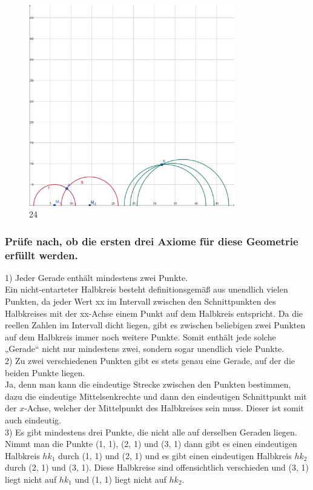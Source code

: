 \documentclass[12pt,a4paper]{article}
\begin{document}
\newpage
\begin{figure}[htbp]     
    \centering             
    \includegraphics[width=0.8\textwidth]{Hyperbolisch.png}     
    \caption{24}     
    \label{fig:24} 
\end{figure}
\subsubsection*{Prüfe nach, ob die ersten drei Axiome für diese Geometrie erfüllt werden.}
1) Jeder Gerade enthält mindestens zwei Punkte.\\
Ein nicht-entarteter Halbkreis besteht definitionsgemäß aus unendlich vielen Punkten, da jeder Wert xx im Intervall zwischen den Schnittpunkten des Halbkreises mit der xx-Achse einem Punkt auf dem Halbkreis entspricht. Da die reellen Zahlen im Intervall dicht liegen, gibt es zwischen beliebigen zwei Punkten auf dem Halbkreis immer noch weitere Punkte. Somit enthält jede solche „Gerade“ nicht nur mindestens zwei, sondern sogar unendlich viele Punkte.\\
2) Zu zwei verschiedenen Punkten gibt es stets genau eine Gerade, auf der die beiden Punkte liegen.\\
Ja, denn man kann die eindeutige Strecke zwischen den Punkten bestimmen, dazu die eindeutige Mittelsenkrechte und dann den eindeutigen Schnittpunkt mit der $x$-Achse, welcher der Mittelpunkt des Halbkreises sein muss. Dieser ist somit auch eindeutig.\\  
3) Es gibt mindestens drei Punkte, die nicht alle auf derselben Geraden liegen.\\
Nimmt man die Punkte (1, 1), (2, 1) und (3, 1) dann gibt es einen eindeutigen Halbkreis $hk_1$ durch (1, 1) und (2, 1) und es gibt einen eindeutigen Halbkreis $hk_2$ durch (2, 1) und (3, 1). Diese Halbkreise sind offensichtlich verschieden und (3, 1) liegt nicht auf $hk_1$ und (1, 1) liegt nicht auf $hk_2$.
\end{document}

